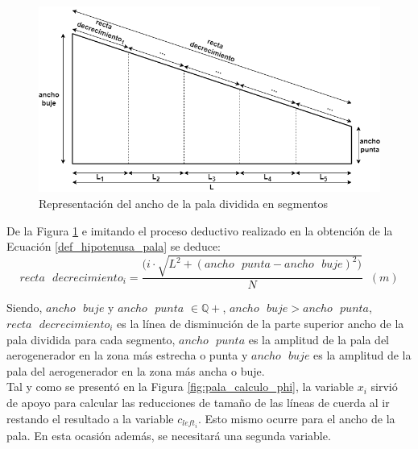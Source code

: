     \begin{figure}[H]
    \centering
    \includegraphics[width=1\textwidth]{images/ancho pala r decrecimiento.png}
    \caption{Representación del ancho de la pala dividida en segmentos}
    \label{fig:ancho_pala_segmentado}
    \end{figure}







\newpage
De la Figura \ref{fig:ancho_pala_segmentado} e imitando el proceso deductivo realizado en la obtención de la Ecuación \ref{def_hipotenusa_pala} se deduce:
\begin{equation}
recta \text{ } decrecimiento_i = \dfrac{( i \cdot \sqrt{L^2 + (ancho \text{ } punta - ancho \text{ } buje)^2)}}{N} \hspace{7pt} (m)
\end{equation}

Siendo, $ancho \text{ } buje$ y $ancho  \text{ } punta$ $\in \mathbb{Q+}$, $ancho \text{ } buje > ancho \text{ } punta$, $recta \text{ } decrecimiento_i $ es la línea de disminución de la parte superior ancho de la pala dividida para cada segmento,  $ancho \text{ } punta$ es la amplitud de la pala del aerogenerador en la zona más estrecha o punta y $ancho \text{ } buje$ es la amplitud de la pala del aerogenerador en la zona más ancha o buje.\\


Tal y como se presentó en la Figura \ref{fig:pala_calculo_phi}, la variable $x_i$ sirvió de apoyo para calcular las reducciones de tamaño de las líneas de cuerda al ir restando el resultado a la variable $c_{left_i}$. Esto mismo ocurre para el ancho de la pala. En esta ocasión además, se necesitará una segunda variable.\\


